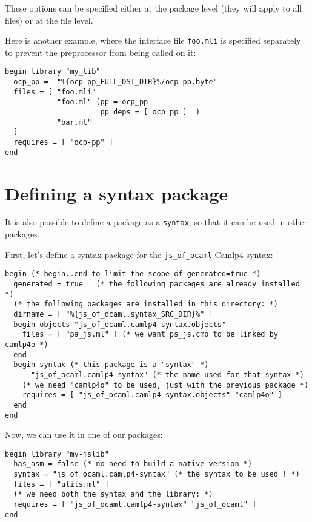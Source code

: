 These options can be specified either at the package level (they will apply
to all files) or at the file level.

Here is another example, where the interface file \verb|foo.mli| is
specified separately to prevent the preprocessor from being called on it:
\begin{verbatim}
begin library "my_lib"
  ocp_pp =  "%{ocp-pp_FULL_DST_DIR}%/ocp-pp.byte"
  files = [ "foo.mli"
            "foo.ml" (pp = ocp_pp
                      pp_deps = [ ocp_pp ]  )
            "bar.ml"
  ]
  requires = [ "ocp-pp" ]
end
\end{verbatim}
 
\section{Defining a syntax package}

It is also possible to define a package as a \verb|syntax|, so that
it can be used in other packages.

First, let's define a syntax package for the \verb|js_of_ocaml| Camlp4 syntax:

\begin{verbatim}
begin (* begin..end to limit the scope of generated=true *)
  generated = true   (* the following packages are already installed *)
  (* the following packages are installed in this directory: *)
  dirname = [ "%{js_of_ocaml.syntax_SRC_DIR}%" ]
  begin objects "js_of_ocaml.camlp4-syntax.objects"
    files = [ "pa_js.ml" ] (* we want ps_js.cmo to be linked by camlp4o *)
  end
  begin syntax (* this package is a "syntax" *)
      "js_of_ocaml.camlp4-syntax" (* the name used for that syntax *)
    (* we need "camlp4o" to be used, just with the previous package *)
    requires = [ "js_of_ocaml.camlp4-syntax.objects" "camlp4o" ]
  end
end
\end{verbatim}

Now, we can use it in one of our packages:

\begin{verbatim}
begin library "my-jslib"
  has_asm = false (* no need to build a native version *)
  syntax = "js_of_ocaml.camlp4-syntax" (* the syntax to be used ! *)
  files = [ "utils.ml" ]
  (* we need both the syntax and the library: *)
  requires = [ "js_of_ocaml.camlp4-syntax" "js_of_ocaml" ]
end

\end{verbatim}

